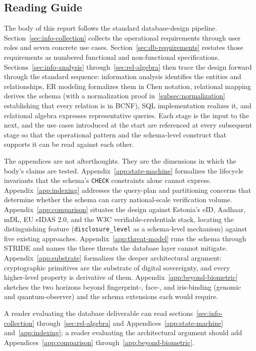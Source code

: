 \documentclass[11pt,letterpaper]{article}
\begin{document}
\subsection{Reading Guide}
\label{subsec:reading-guide}

The body of this report follows the standard database-design pipeline. Section~\ref{sec:info-collection} collects the operational requirements through user roles and seven concrete use cases. Section~\ref{sec:db-requirements} restates those requirements as numbered functional and non-functional specifications. Sections~\ref{sec:info-analysis} through~\ref{sec:rel-algebra} then trace the design forward through the standard sequence: information analysis identifies the entities and relationships, ER modeling formalizes them in Chen notation, relational mapping derives the schema (with a normalization proof in~\ref{subsec:normalization} establishing that every relation is in BCNF), SQL implementation realizes it, and relational algebra expresses representative queries. Each stage is the input to the next, and the use cases introduced at the start are referenced at every subsequent stage so that the operational pattern and the schema-level construct that supports it can be read against each other.

The appendices are not afterthoughts. They are the dimensions in which the body's claims are tested. Appendix~\ref{app:state-machine} formalizes the lifecycle invariants that the schema's \texttt{CHECK} constraints alone cannot express. Appendix~\ref{app:indexing} addresses the query-plan and partitioning concerns that determine whether the schema can carry national-scale verification volume. Appendix~\ref{app:comparison} situates the design against Estonia's eID, Aadhaar, mDL, EU eIDAS 2.0, and the W3C verifiable-credentials stack, locating the distinguishing feature (\texttt{disclosure\_level} as a schema-level mechanism) against five existing approaches. Appendix~\ref{app:threat-model} runs the schema through STRIDE and names the three threats the database layer cannot mitigate. Appendix~\ref{app:substrate} formalizes the deeper architectural argument: cryptographic primitives are the substrate of digital sovereignty, and every higher-level property is derivative of them. Appendix~\ref{app:beyond-biometric} sketches the two horizons beyond fingerprint-, face-, and iris-binding (genomic and quantum-observer) and the schema extensions each would require.

A reader evaluating the database deliverable can read sections~\ref{sec:info-collection} through~\ref{sec:rel-algebra} and Appendices~\ref{app:state-machine} and~\ref{app:indexing}; a reader evaluating the architectural argument should add Appendices~\ref{app:comparison} through~\ref{app:beyond-biometric}.
\end{document}
